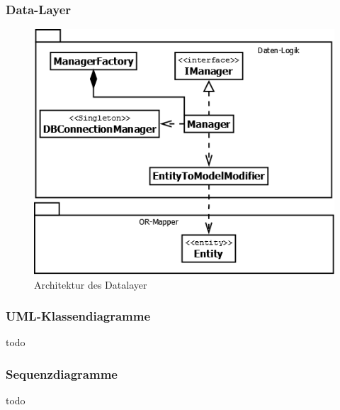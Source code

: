 \subsubsection{Data-Layer}
\begin{figure}[H]
	\includegraphics[width=1.0\linewidth]{Images/DataLayer-Architektur}
	\caption{Architektur des Datalayer}
	\label{fig:datalayer-architektur}
\end{figure}

\subsubsection{UML-Klassendiagramme}
todo


\subsubsection{Sequenzdiagramme}
todo



